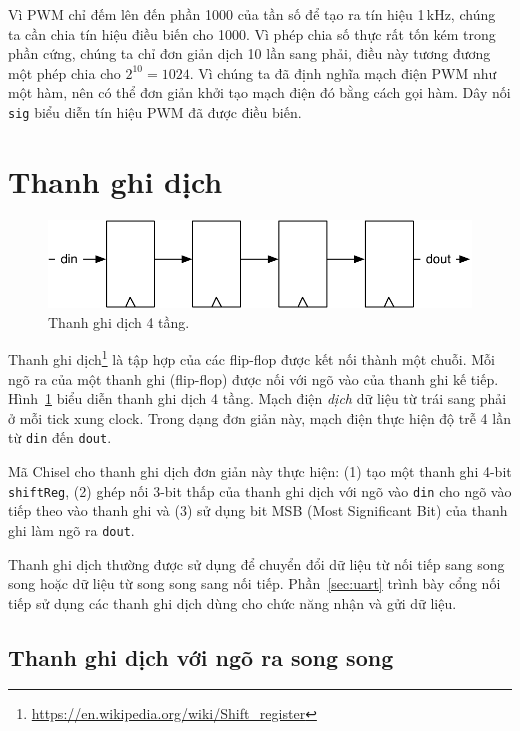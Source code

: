 \documentclass[%
    10pt,
    headinclude, footexclude,
    openright, %
    notitlepage,
    cleardoubleempty,
    headsepline,
    pointlessnumbers,
    bibtotoc, idxtotoc,
    ]{scrbook}
\newcommand{\code}[1]{{\small{\texttt{#1}}}}
\newcommand{\scale}{0.7}
\newcommand{\myref}[2]{\href{#1}{#2}}
\renewcommand{\myref}[2]{{#2}{\footnote{\url{#1}}}}
\begin{document}
Vì PWM chỉ đếm lên đến phần 1000 của tần số để tạo ra tín hiệu 1\,kHz, 
chúng ta cần chia tín hiệu điều biến cho 1000. Vì phép chia số thực rất tốn kém trong phần cứng, 
chúng ta chỉ đơn giản dịch 10 lần sang phải, điều này tương đương một phép chia cho $2^{10} = 1024$.
Vì chúng ta đã định nghĩa mạch điện PWM như một hàm, nên có thể đơn giản khởi tạo mạch điện đó bằng cách 
gọi hàm. Dây nối \code{sig} biểu diễn tín hiệu PWM đã được điều biến. 

\section{Thanh ghi dịch}

\begin{figure}
  \centering
  \includegraphics[scale=\scale]{figures/shiftregister}
  \caption{Thanh ghi dịch 4 tầng.}
  \label{fig:shiftregister}
\end{figure}


\myref{https://en.wikipedia.org/wiki/Shift_register}{Thanh ghi dịch} là tập hợp của các flip-flop
được kết nối thành một chuỗi. Mỗi ngõ ra của một thanh ghi (flip-flop) được nối với ngõ vào của 
thanh ghi kế tiếp. Hình~\ref{fig:shiftregister} biểu diễn thanh ghi dịch 4 tầng.
Mạch điện \emph{dịch} dữ liệu từ trái sang phải ở mỗi tick xung clock. Trong dạng đơn giản này,
mạch điện thực hiện độ trễ 4 lần từ \code{din} đến \code{dout}.

Mã Chisel cho thanh ghi dịch đơn giản này thực hiện: (1) tạo một thanh ghi 4-bit \code{shiftReg}, 
(2) ghép nối 3-bit thấp của thanh ghi dịch với ngõ vào \code{din} cho ngõ vào tiếp theo vào thanh ghi 
và (3) sử dụng bit MSB (Most Significant Bit) của thanh ghi làm ngõ ra \code{dout}. 


Thanh ghi dịch thường được sử dụng để chuyển đổi dữ liệu từ nối tiếp sang song song hoặc dữ liệu từ song song sang nối tiếp. Phần~\ref{sec:uart} trình bày cổng nối tiếp sử dụng các thanh ghi dịch dùng cho chức năng nhận và gửi dữ liệu.

\subsection{Thanh ghi dịch với ngõ ra song song}
\end{document}
